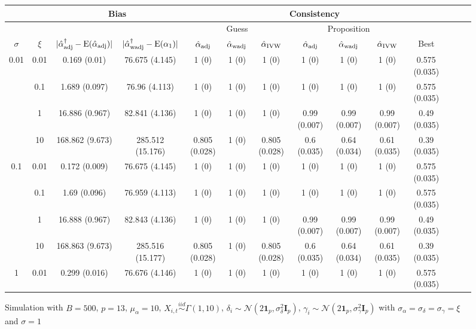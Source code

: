 \documentclass[11pt]{article}
\newcommand{\simiid}{\stackrel{iid}{\sim}} %
\def\normal#1#2{\mathcal{N}(#1,#2)} %
\def\E#1{\mathrm{E}(#1)} %
\theoremstyle{definition}
\begin{document}
\begin{sidewaysfigure}
\centering
\caption{Simulation  with $B = 500$, $p = 13$, $\mu_{\alpha}=10$, $X_{i,t} \simiid \Gamma(1,10)$, $\delta_i \sim \normal{2\mathbf{1}_p}{\sigma^2_{\delta}\mathbf{I}_p}$, $\gamma_i \sim \normal{2\mathbf{1}_p}{\sigma^2_{\gamma}\mathbf{I}_p}$ with $\sigma_{\alpha} = \sigma_{\delta}=\sigma_{\gamma}=\xi$ and $\sigma = 1$}
\begin{tabular}{cc|cc|ccc|ccc|ccc|c}
  & & \multicolumn{2}{c|}{Bias}  & \multicolumn{7}{c}{Consistency}  \\ 
  \hline 
  & &  & & \multicolumn{3}{|c|}{Guess} & \multicolumn{3}{|c|}{Proposition} & \\ 
$\sigma$   & $\xi$ & $|\hat{\alpha}_{\rm adj}^{\dagger}-\E{\hat{\alpha}_{\rm adj}}|$ & $|\hat{\alpha}_{\rm wadj}^{\dagger}-\E{\alpha_1}|$ & $\hat{\alpha}_{\rm adj}$  & $\hat{\alpha}_{\rm wadj}$ & $\hat{\alpha}_{\rm IVW}$ & $\hat{\alpha}_{\rm adj}$  & $\hat{\alpha}_{\rm wadj}$ & $\hat{\alpha}_{\rm IVW}$ &  Best \\[.3cm]  
  \hline
  \multirow{4}{*}{0.01} & 0.01 & 0.169 (0.01) & 76.675 (4.145) & 1 (0) & 1 (0) & 1 (0) & 1 (0) & 1 (0) & 1 (0) & 0.575 (0.035) \\ 
    & 0.1 & 1.689 (0.097) & 76.96 (4.113) & 1 (0) & 1 (0) & 1 (0) & 1 (0) & 1 (0) & 1 (0) & 0.575 (0.035) \\ 
    & 1 & 16.886 (0.967) & 82.841 (4.136) & 1 (0) & 1 (0) & 1 (0) & 0.99 (0.007) & 0.99 (0.007) & 0.99 (0.007) & 0.49 (0.035) \\ 
    & 10 & 168.862 (9.673) & 285.512 (15.176) & 0.805 (0.028) & 1 (0) & 0.805 (0.028) & 0.6 (0.035) & 0.64 (0.034) & 0.61 (0.035) & 0.39 (0.035) \\[.3cm]  
    \multirow{4}{*}{0.1} & 0.01 & 0.172 (0.009) & 76.675 (4.145) & 1 (0) & 1 (0) & 1 (0) & 1 (0) & 1 (0) & 1 (0) & 0.575 (0.035) \\ 
    & 0.1 & 1.69 (0.096) & 76.959 (4.113) & 1 (0) & 1 (0) & 1 (0) & 1 (0) & 1 (0) & 1 (0) & 0.575 (0.035) \\ 
    & 1 & 16.888 (0.967) & 82.843 (4.136) & 1 (0) & 1 (0) & 1 (0) & 0.99 (0.007) & 0.99 (0.007) & 0.99 (0.007) & 0.49 (0.035) \\ 
    & 10 & 168.863 (9.673) & 285.516 (15.177) & 0.805 (0.028) & 1 (0) & 0.805 (0.028) & 0.6 (0.035) & 0.64 (0.034) & 0.61 (0.035) & 0.39 (0.035) \\[.3cm]  
    \multirow{4}{*}{1} & 0.01 & 0.299 (0.016) & 76.676 (4.146) & 1 (0) & 1 (0) & 1 (0) & 1 (0) & 1 (0) & 1 (0) & 0.575 (0.035) \\ 

\end{tabular}
\end{sidewaysfigure}
\end{document}
